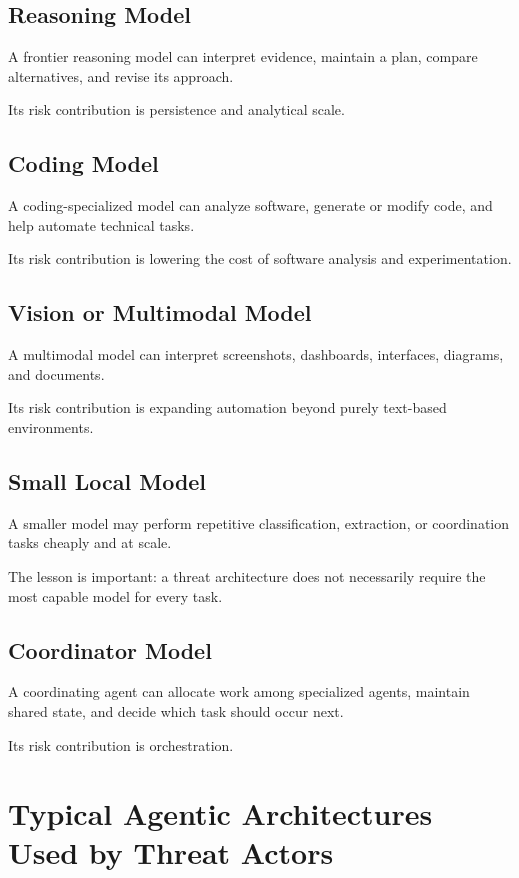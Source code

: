 \subsection{Reasoning Model}

A frontier reasoning model can interpret evidence, maintain a plan, compare alternatives, and revise its approach.

Its risk contribution is persistence and analytical scale.

\subsection{Coding Model}

A coding-specialized model can analyze software, generate or modify code, and help automate technical tasks.

Its risk contribution is lowering the cost of software analysis and experimentation.

\subsection{Vision or Multimodal Model}

A multimodal model can interpret screenshots, dashboards, interfaces, diagrams, and documents.

Its risk contribution is expanding automation beyond purely text-based environments.

\subsection{Small Local Model}

A smaller model may perform repetitive classification, extraction, or coordination tasks cheaply and at scale.

The lesson is important: a threat architecture does not necessarily require the most capable model for every task.

\subsection{Coordinator Model}

A coordinating agent can allocate work among specialized agents, maintain shared state, and decide which task should occur next.

Its risk contribution is orchestration.

\section{Typical Agentic Architectures Used by Threat Actors}

